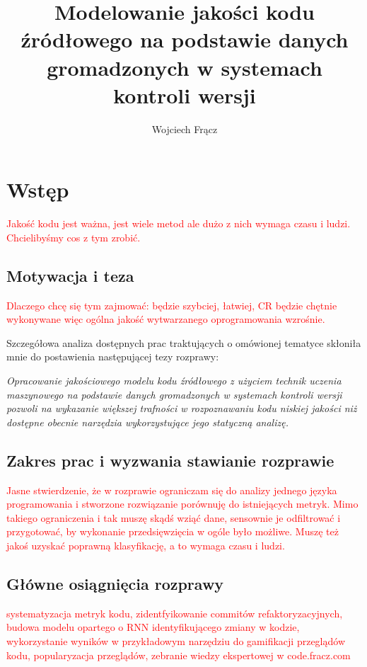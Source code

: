 \documentclass[12pt]{report}
\title{Modelowanie jakości kodu źródłowego na podstawie danych gromadzonych w systemach kontroli wersji}
\author{Wojciech Frącz}
\begin{document}
\maketitle

\tableofcontents

\chapter{Wstęp}
\label{section:introduction} 

\textcolor{red}{Jakość kodu jest ważna, jest wiele metod ale dużo z nich wymaga czasu i ludzi. Chcielibyśmy cos z tym zrobić.}

\section{Motywacja i teza}
\textcolor{red}{Dlaczego chcę się tym zajmować: będzie szybciej, łatwiej, CR będzie chętnie wykonywane więc ogólna jakość wytwarzanego oprogramowania wzrośnie.}

Szczegółowa analiza dostępnych prac traktujących o omówionej tematyce skłoniła mnie do postawienia następującej tezy rozprawy:

\begin{addmargin}{1cm}
\textit{Opracowanie jakościowego modelu kodu źródłowego z użyciem technik uczenia maszynowego na podstawie danych gromadzonych w systemach kontroli wersji pozwoli na wykazanie większej trafności w rozpoznawaniu kodu niskiej jakości niż dostępne obecnie narzędzia wykorzystujące jego statyczną analizę.}
\end{addmargin}

\section{Zakres prac i wyzwania stawianie rozprawie}
\textcolor{red}{Jasne stwierdzenie, że w rozprawie ograniczam się do analizy jednego języka programowania i stworzone rozwiązanie porównuję do istniejących metryk. Mimo takiego ograniczenia i tak muszę skądś wziąć dane, sensownie je odfiltrować i przygotować, by wykonanie przedsięwzięcia w ogóle było możliwe. Muszę też jakoś uzyskać poprawną klasyfikację, a to wymaga czasu i ludzi.}

\section{Główne osiągnięcia rozprawy}
\textcolor{red}{systematyzacja metryk kodu, zidentfyikowanie commitów refaktoryzacyjnych, budowa modelu opartego o RNN identyfikującego zmiany w kodzie, wykorzystanie wyników w przykładowym narzędziu do gamifikacji przeglądów kodu, popularyzacja przeglądów, zebranie wiedzy ekspertowej w code.fracz.com}
\end{document}
